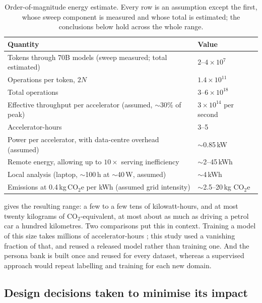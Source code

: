 \begin{table}[t]
\centering
\small
\caption{Order-of-magnitude energy estimate. Every row is an assumption except the first, whose sweep
component is measured and whose total is estimated; the conclusions below hold across the whole range.}
\label{tab:energy}
\begin{tabular}{@{}l l@{}}
\toprule
Quantity & Value \\
\midrule
Tokens through 70B models (sweep measured; total estimated) & $2$--$4 \times 10^{7}$ \\
Operations per token, $2N$ \cite{kaplan2020scaling} & $1.4 \times 10^{11}$ \\
Total operations & $3$--$6 \times 10^{18}$ \\
Effective throughput per accelerator (assumed, $\sim$30\% of peak) & $3 \times 10^{14}$ per second \\
Accelerator-hours & 3--5 \\
Power per accelerator, with data-centre overhead (assumed) & $\sim$0.85\,kW \\
Remote energy, allowing up to $10\times$ serving inefficiency & $\sim$2--45\,kWh \\
Local analysis (laptop, $\sim$100\,h at $\sim$40\,W, assumed) & $\sim$4\,kWh \\
Emissions at 0.4\,kg\,CO$_2$e per kWh (assumed grid intensity) & $\sim$2.5--20\,kg CO$_2$e \\
\bottomrule
\end{tabular}
\end{table}

 gives the resulting range: a few to a few tens of kilowatt-hours, and at most
twenty kilograms of CO$_2$-equivalent, at most about as much as driving a petrol car a hundred
kilometres. Two comparisons put this in context. Training a model of this size takes millions of
accelerator-hours \cite{grattafiori2024llama}; this study used a vanishing fraction of that, and
reused a released model rather than training one. And the persona bank is built once and reused for
every dataset, whereas a supervised approach would repeat labelling and training for each new
domain.

\subsection{Design decisions taken to minimise its impact}


